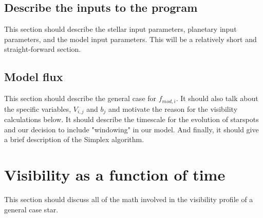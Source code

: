 \documentclass[iop]{emulateapj}
\newcommand{\fmod}{\mbox{$f_{mod,i}$}}
\begin{document}
			
\subsection{Describe the inputs to the program}
	This section should describe the stellar input parameters, planetary input parameters, and the model input parameters.
	This will be a relatively short and straight-forward section.

\subsection{Model flux}
	This section should describe the general case for \fmod. It should also talk about the specific variables, $V_{i,j}$ and $b_j$ and motivate the reason for the visibility calculations below. It should describe the timescale for the evolution of starspots and our decision to include "windowing" in our model. And finally, it should give a brief description of the Simplex algorithm.
	
\section{Visibility as a function of time}
	This section should discuss all of the math involved in the visibility profile of a general case star.
\end{document}
